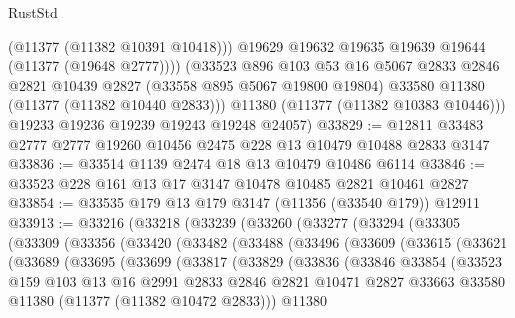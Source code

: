 \begin{lexlean}{RustStd}
\begin{coremodule}
              (@11377 (@11382 @10391 @10418)))
            @19629
            @19632
            @19635
            @19639
            @19644
            (@11377 (@19648 @2777))))
        (@33523
          @896
          @103
          @53
          @16
          @5067
          @2833
          @2846
          @2821
          @10439
          @2827
          (@33558 @895 @5067 @19800 @19804)
          @33580
          @11380
          (@11377 (@11382 @10440 @2833)))
        @11380
        (@11377 (@11382 @10383 @10446)))
      @19233
      @19236
      @19239
      @19243
      @19248
      @24057)
@33829 := @12811 @33483 @2777 @2777 @19260 @10456 @2475 @228 @13 @10479 @10488 @2833 @3147
@33836 := @33514 @1139 @2474 @18 @13 @10479 @10486 @6114
@33846 := @33523 @228 @161 @13 @17 @3147 @10478 @10485 @2821 @10461 @2827
@33854 := @33535 @179 @13 @179 @3147 (@11356 (@33540 @179)) @12911
@33913 := @33216
    (@33218
      (@33239
        (@33260
          (@33277
            (@33294
              (@33305
                (@33309
                  (@33356
                    (@33420
                      (@33482
                        (@33488
                          (@33496
                            (@33609
                              (@33615
                                (@33621
                                  (@33689
                                    (@33695
                                      (@33699
                                        (@33817
                                          (@33829
                                            (@33836
                                              (@33846
                                                @33854
                                                (@33523
                                                  @159
                                                  @103
                                                  @13
                                                  @16
                                                  @2991
                                                  @2833
                                                  @2846
                                                  @2821
                                                  @10471
                                                  @2827
                                                  @33663
                                                  @33580
                                                  @11380
                                                  (@11377 (@11382 @10472 @2833)))
                                                @11380

\end{coremodule}
\end{lexlean}

